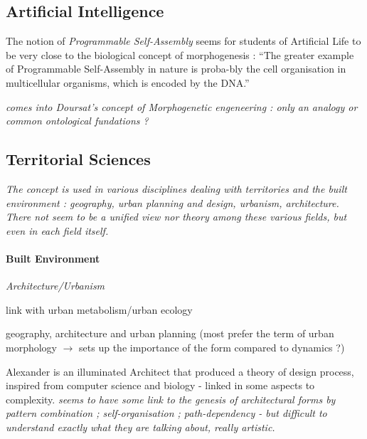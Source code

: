 \documentclass{article}
\begin{document}




\subsection{Artificial Intelligence}


The notion of \emph{Programmable Self-Assembly} seems for students of Artificial Life to be very close to the biological concept of morphogenesis : ``The greater example of Programmable Self-Assembly in nature is proba-bly the cell organisation in multicellular organisms, which is encoded by the DNA.''

\textit{comes into Doursat's concept of Morphogenetic engeneering : only an analogy or common ontological fundations ?}




\subsection{Territorial Sciences}

\textit{The concept is used in various disciplines dealing with territories and the built environment : geography, urban planning and design, urbanism, architecture. There not seem to be a unified view nor theory among these various fields, but even in each field itself.}

\paragraph{Built Environment}

\textit{Architecture/Urbanism}

\cite{olsen1982urban} link with urban metabolism/urban ecology

\cite{moudon1997urban} geography, architecture and urban planning (most prefer the term of urban morphology $\rightarrow$ sets up the importance of the form compared to dynamics ?)

\cite{mehaffy2007notes} Alexander is an illuminated Architect that produced a theory of design process, inspired from computer science and biology - linked in some aspects to complexity. \textit{seems to have some link to the genesis of architectural forms by pattern combination ; self-organisation ; path-dependency - but difficult to understand exactly what they are talking about, really artistic.}
\end{document}
